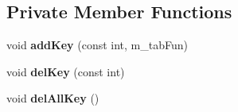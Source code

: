\subsection*{Private Member Functions}
\begin{DoxyCompactItemize}
\item 
\hypertarget{class_save_state_a2ed3819aa1048cc66a32a6c2eae1f1c0}{}void {\bfseries add\+Key} (const int, m\+\_\+tab\+Fun)\label{class_save_state_a2ed3819aa1048cc66a32a6c2eae1f1c0}

\item 
\hypertarget{class_save_state_a094a602be0f4618e73b0d069f44c2480}{}void {\bfseries del\+Key} (const int)\label{class_save_state_a094a602be0f4618e73b0d069f44c2480}

\item 
\hypertarget{class_save_state_a7714649c5d0335b11c9d050308ac0698}{}void {\bfseries del\+All\+Key} ()\label{class_save_state_a7714649c5d0335b11c9d050308ac0698}

\end{DoxyCompactItemize}
